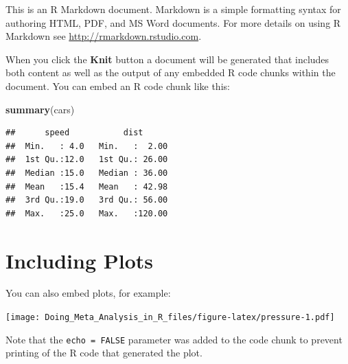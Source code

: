 \documentclass[]{book}
\newenvironment{Shaded}{\begin{snugshade}}{\end{snugshade}}
\newcommand{\KeywordTok}[1]{\textcolor[rgb]{0.13,0.29,0.53}{\textbf{#1}}}
\newcommand{\NormalTok}[1]{#1}
\begin{document}
This is an R Markdown document. Markdown is a simple formatting syntax for authoring HTML, PDF, and MS Word documents. For more details on using R Markdown see \url{http://rmarkdown.rstudio.com}.

When you click the \textbf{Knit} button a document will be generated that includes both content as well as the output of any embedded R code chunks within the document. You can embed an R code chunk like this:

\begin{Shaded}
\begin{Highlighting}[]
\KeywordTok{summary}\NormalTok{(cars)}
\end{Highlighting}
\end{Shaded}

\begin{verbatim}
##      speed           dist       
##  Min.   : 4.0   Min.   :  2.00  
##  1st Qu.:12.0   1st Qu.: 26.00  
##  Median :15.0   Median : 36.00  
##  Mean   :15.4   Mean   : 42.98  
##  3rd Qu.:19.0   3rd Qu.: 56.00  
##  Max.   :25.0   Max.   :120.00
\end{verbatim}

\hypertarget{including-plots}{%
\section{Including Plots}\label{including-plots}}

You can also embed plots, for example:

\texttt{[image: Doing\_Meta\_Analysis\_in\_R\_files/figure-latex/pressure-1.pdf]}

Note that the \texttt{echo\ =\ FALSE} parameter was added to the code chunk to prevent printing of the R code that generated the plot.


\end{document}

